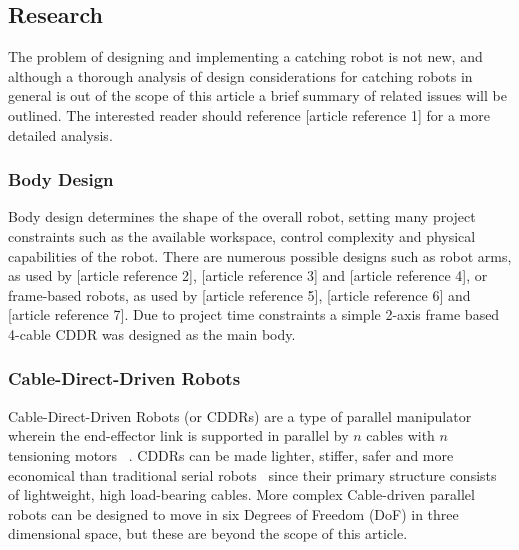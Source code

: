 \documentclass[conference]{IEEEtran}
\begin{document}
\subsection{Research}
The problem of designing and implementing a catching robot is not new, and although a thorough analysis of design considerations for catching robots in general is out of the scope of this article a brief summary of related issues will be outlined. The interested reader should reference [article reference 1] for a more detailed analysis.

\subsubsection{Body Design}
Body design determines the shape of the overall robot, setting many project constraints such as the available workspace, control complexity and physical capabilities of the robot. There are numerous possible designs such as robot arms, as used by [article reference 2], [article reference 3] and [article reference 4], or frame-based robots, as used by [article reference 5], [article reference 6] and [article reference 7]. Due to project time constraints a simple 2-axis frame based 4-cable CDDR was designed as the main body.

\subsubsection{Cable-Direct-Driven Robots}
Cable-Direct-Driven Robots (or CDDRs) are a type of parallel manipulator wherein the end-effector link is supported in parallel by $n$ cables with $n$ tensioning motors ~\cite{CDDR:description}. CDDRs can be made lighter, stiffer, safer and more economical than traditional serial robots~\cite{WilliamsII2003} since their primary structure consists of lightweight, high load-bearing cables. More complex Cable-driven parallel robots can be designed to move in six Degrees of Freedom (DoF) in three dimensional space, but these are beyond the scope of this article. 
\end{document}
